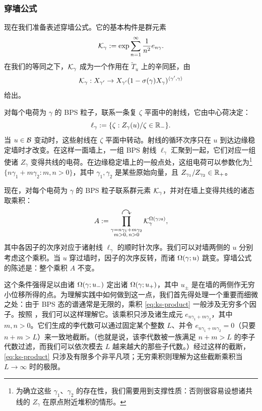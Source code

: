\subsubsection*{穿墙公式}

现在我们准备表述穿墙公式。它的基本构件是群元素
\begin{equation}
\mathcal{K}_\gamma := \exp \sum_{n=1}^{\infty} \frac{1}{n^2} e_{n \gamma}.
\end{equation}
在我们的等同之下，$\mathcal{K}_\gamma$ 成为一个作用在 $\tilde{T}_u$ 上的辛同胚，由
\begin{equation} \label{eq:ks-symplect}
\mathcal{K}_\gamma : X_{\gamma'} \to X_{\gamma'} (1- \sigma(\gamma)
X_\gamma)^{\langle \gamma',\gamma \rangle}
\end{equation}
给出。

对每个电荷为 $\gamma$ 的 BPS 粒子，联系一条复 $\zeta$ 平面中的射线，它由中心荷决定：
\begin{equation}
\ell_\gamma := \{\zeta: Z_\gamma(u) / \zeta \in \mathbb{R}_- \}.
\end{equation}
当 $u \in \mathcal{B}$ 变动时，这些射线在 $\zeta$ 平面中转动。射线的循环次序只在 $u$ 到达边缘稳定墙时才改变。在这样一面墙上，一组 BPS 射线 $\ell_\gamma$ 汇聚到一起，它们对应一组使诸 $Z_\gamma$ 变得共线的电荷。在边缘稳定墙上的一般点处，这组电荷可以参数化为\footnote{为确立这些 $\gamma_1$、$\gamma_2$ 的存在性，我们需要用到支撑性质：否则很容易设想诸共线的 $Z_\gamma$ 在原点附近堆积的情形。} $\{n \gamma_1 + m \gamma_2: m, n > 0\}$，其中 $\gamma_1, \gamma_2$ 是某些原始向量，且 $Z_{\gamma_1} / Z_{\gamma_2} \in \mathbb{R}_+$。

现在，对每个电荷为 $\gamma$ 的 BPS 粒子联系群元素 $\mathcal{K}_\gamma$，并对在墙上变得共线的诸态取乘积：
\begin{equation} \label{eq:ks-product}
A := \prod^{\text{\Large$\curvearrowright$}}_{\substack{\gamma = n \gamma_1 + m \gamma_2 \\ m>0,\,n>0}}
\mathcal{K}_\gamma^{\Omega(\gamma;u)},
\end{equation}
其中各因子的次序对应于诸射线 $\ell_\gamma$ 的顺时针次序。我们可以对墙两侧的 $u$ 分别考虑这个乘积。当 $u$ 穿过墙时，因子的次序反转，而诸 $\Omega(\gamma;u)$ 跳变。穿墙公式的陈述是：整个乘积 $A$ 不变。

这个条件强得足以由诸 $\Omega(\gamma;u_-)$ 定出诸 $\Omega(\gamma;u_+)$，其中 $u_\pm$ 是在墙的两侧作无穷小位移所得的点。为理解实践中如何做到这一点，我们首先得处理一个重要而细微之处：由于 BPS 态的谱通常是无限的，乘积 \eqref{eq:ks-product} 一般涉及无穷多个因子。按照 \cite{ks1}，我们可以这样理解它。该乘积只涉及诸生成元 $e_{n \gamma_1 + m \gamma_2}$，其中 $m,n>0$。它们生成的李代数可以通过固定某个整数 $L$、并令 $e_{n \gamma_1 + m \gamma_2} = 0$（只要 $n+m > L$）来一致地截断。（也就是说，该李代数被一族满足 $n+m>L$ 的李子代数过滤，而我们可以依次模去 $L$ 越来越大的那些子代数。）经过这样的截断，\eqref{eq:ks-product} 只涉及有限多个非平凡项；无穷乘积则理解为这些截断乘积当 $L \to \infty$ 时的极限。

